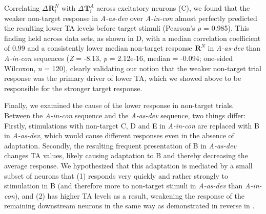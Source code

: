 \documentclass[9pt,lineno,onehalfspacing]{elife}
\newcommand{\dev}{\textit{A-as-dev}}
\newcommand{\msc}{\textit{A-in-con}}
\newcommand{\R}[3][]{{}^{#1}_{}\boldsymbol R^{#2}_{#3}}
\newcommand{\T}[3][]{{}^{#1}_{}\boldsymbol T^{#2}_{#3}}
\begin{document}
Correlating $\Delta \R{N}{i}$ with $\Delta \T{A}{i}$ across excitatory neurons (C), we found that the weaker non-target response in \dev{} over \msc{} almost perfectly predicted the resulting lower TA levels before target stimuli (Pearson's $\rho$ = 0.985).
This finding held across data sets, as shown in D, with a median correlation coefficient of 0.99 and a consistently lower median non-target response $\R{N}{}$ in \dev{} than \msc{} sequences (\textit{Z} = -8.13, \textit{p} = 2.12e-16, median = -0.094; one-sided Wilcoxon, \textit{n} = 120), clearly validating our notion that the weaker non-target trial response was the primary driver of lower TA, which we showed above to be responsible for the stronger target response.

Finally, we examined the cause of the lower response in non-target trials. Between the \msc{} sequence and the \dev{} sequence, two things differ: Firstly, stimulations with non-target C, D and E in \msc{} are replaced with B in \dev{}, which would cause different responses even in the absence of adaptation. Secondly, the resulting  frequent presentation of B in \dev{} changes TA values, likely causing adaptation to B and thereby decreasing the average response. We hypothesized that this adaptation is mediated by a small subset of neurons that (1) responds very quickly and rather strongly to stimulation in B (and therefore more to non-target stimuli in \dev{} than \msc{}), and (2) has higher TA levels as a result, weakening the response of the remaining downstream neurons in the same way as demonstrated in reverse in .
\end{document}
